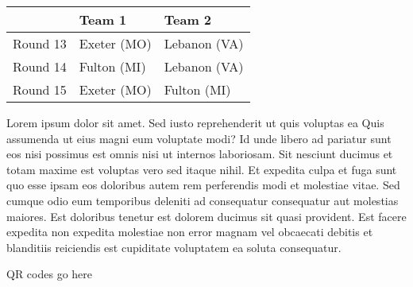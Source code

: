 \documentclass{article}%
\begin{document}
%
\begin{tabularx}{\textwidth}{|c|Y|Y|}%
\hline%
&Team 1&Team 2\\%
\hline%
Round 13&Exeter (MO)&Lebanon (VA)\\%
Round 14&Fulton (MI)&Lebanon (VA)\\%
Round 15&Exeter (MO)&Fulton (MI)\\%
\hline%
\end{tabularx}%
\vspace*{8pt}%
\newline%
Lorem ipsum dolor sit amet. Sed iusto reprehenderit ut quis voluptas ea Quis assumenda ut eius magni eum voluptate modi? Id unde libero ad pariatur sunt eos nisi possimus est omnis nisi ut internos laboriosam. Sit nesciunt ducimus et totam maxime est voluptas vero sed itaque nihil. Et expedita culpa et fuga sunt quo esse ipsam eos doloribus autem rem perferendis modi et molestiae vitae.\newline%
\newline%
Sed cumque odio eum temporibus deleniti ad consequatur consequatur aut molestias maiores. Est doloribus tenetur est dolorem ducimus sit quasi provident. Est facere expedita non expedita molestiae non error magnam vel obcaecati debitis et blanditiis reiciendis est cupiditate voluptatem ea soluta consequatur.%
\vspace*{140pt}%
\begin{center}%
\begin{Huge}%
QR codes go here%
\end{Huge}%
\end{center}%
\newpage%
\end{document}
